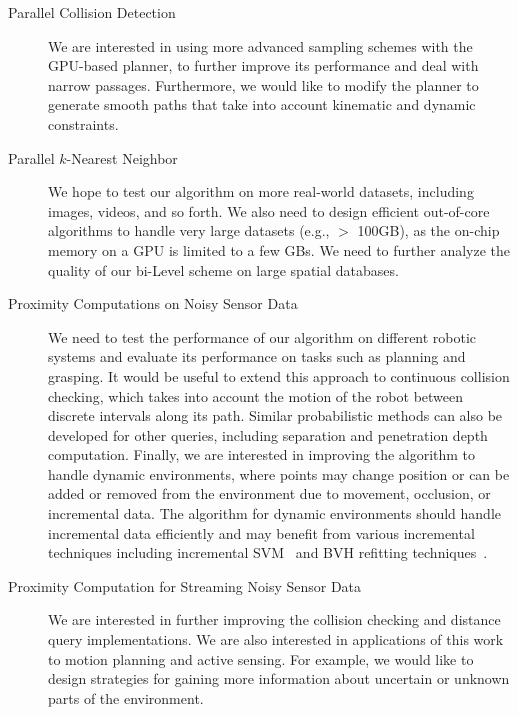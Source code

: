 \begin{description}
\item[Parallel Collision Detection] We are interested in using more advanced sampling schemes with the GPU-based planner, to further improve its performance and deal with narrow passages. Furthermore, we would like to
modify the planner to generate smooth paths that take into account kinematic and dynamic constraints.
\item[Parallel $k$-Nearest Neighbor] We hope to test our algorithm on more real-world datasets, including images, videos, and so forth. We also need to design efficient out-of-core algorithms to handle very large datasets (e.g., $>$ 100GB), as the on-chip memory on a GPU is limited to a few GBs. We need to further analyze the quality of our bi-Level scheme on large spatial databases.

\item[Proximity Computations on Noisy Sensor Data] We need to test the performance of our algorithm on different robotic systems and evaluate its performance
on tasks such as planning and grasping. It would be useful to extend this approach to continuous collision checking, which takes into account the motion of the robot
between discrete intervals along its path. Similar probabilistic methods can also be developed for other queries,
including separation and penetration depth computation. Finally, we are interested in improving the algorithm to handle dynamic environments, where points may change position or can be added or removed from the environment due to movement, occlusion, or incremental data.
The algorithm for dynamic environments should handle incremental data efficiently and may benefit from various incremental techniques including incremental SVM~\cite{Gert:nips:2001} and BVH refitting techniques~\cite{Lauterbach10}.
\item[Proximity Computation for Streaming Noisy Sensor Data] We are interested in further improving the collision
checking and distance query implementations. We are also interested in
applications of this work to motion planning and active sensing. For example, we would like
to design strategies for gaining more information about uncertain or
unknown parts of the environment.
\end{description}







